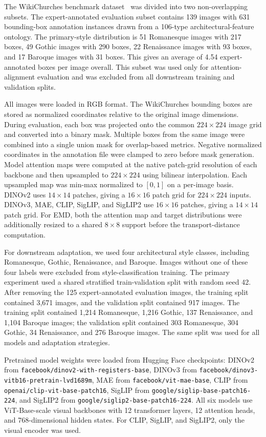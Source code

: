 \documentclass[lineno,pdflatex,sn-mathphys-num]{sn-jnl}%
\theoremstyle{thmstyleone}%
\theoremstyle{thmstyletwo}%
\theoremstyle{thmstylethree}%
\begin{document}
The WikiChurches benchmark dataset~\cite{Barz21WikiChurches} was divided into two non-overlapping subsets. The expert-annotated evaluation subset contains 139 images with 631 bounding-box annotation instances drawn from a 106-type architectural-feature ontology. The primary-style distribution is 51 Romanesque images with 217 boxes, 49 Gothic images with 290 boxes, 22 Renaissance images with 93 boxes, and 17 Baroque images with 31 boxes. This gives an average of 4.54 expert-annotated boxes per image overall. This subset was used only for attention-alignment evaluation and was excluded from all downstream training and validation splits.

All images were loaded in RGB format. The WikiChurches bounding boxes are stored as normalized coordinates relative to the original image dimensions. During evaluation, each box was projected onto the common $224 \times 224$ image grid and converted into a binary mask. Multiple boxes from the same image were combined into a single union mask for overlap-based metrics. Negative normalized coordinates in the annotation file were clamped to zero before mask generation. Model attention maps were computed at the native patch-grid resolution of each backbone and then upsampled to $224 \times 224$ using bilinear interpolation. Each upsampled map was min-max normalized to $[0,1]$ on a per-image basis. DINOv2 uses $14 \times 14$ patches, giving a $16 \times 16$ patch grid for $224 \times 224$ inputs. DINOv3, MAE, CLIP, SigLIP, and SigLIP2 use $16 \times 16$ patches, giving a $14 \times 14$ patch grid. For EMD, both the attention map and target distributions were additionally resized to a shared $8 \times 8$ support before the transport-distance computation.

For downstream adaptation, we used four architectural style classes, including Romanesque, Gothic, Renaissance, and Baroque. Images without one of these four labels were excluded from style-classification training. The primary experiment used a shared stratified train-validation split with random seed 42. After removing the 125 expert-annotated evaluation images, the training split contained 3,671 images, and the validation split contained 917 images. The training split contained 1,214 Romanesque, 1,216 Gothic, 137 Renaissance, and 1,104 Baroque images; the validation split contained 303 Romanesque, 304 Gothic, 34 Renaissance, and 276 Baroque images. The same split was used for all models and adaptation strategies.

Pretrained model weights were loaded from Hugging Face checkpoints: DINOv2 from \texttt{facebook/dinov2-with-registers-base}, DINOv3 from \texttt{facebook/dinov3-vitb16-pretrain-lvd1689m}, MAE from \texttt{facebook/vit-mae-base}, CLIP from \texttt{openai/clip-vit-base-patch16}, SigLIP from \texttt{google/siglip-base-patch16-224}, and SigLIP2 from \texttt{google/siglip2-base-patch16-224}. All six models use ViT-Base-scale visual backbones with 12 transformer layers, 12 attention heads, and 768-dimensional hidden states. For CLIP, SigLIP, and SigLIP2, only the visual encoder was used.
\end{document}
